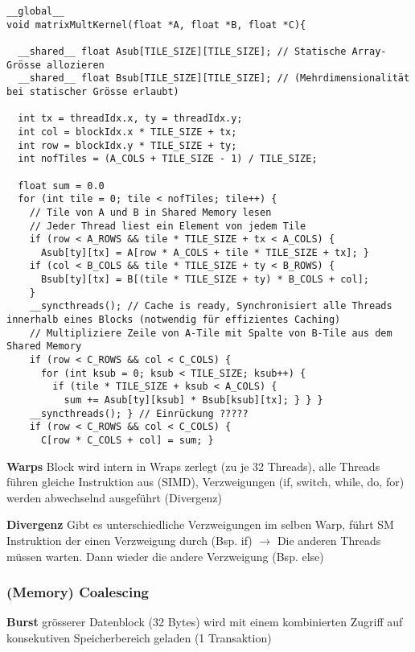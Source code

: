 \begin{lstlisting}
__global__
void matrixMultKernel(float *A, float *B, float *C){

  __shared__ float Asub[TILE_SIZE][TILE_SIZE]; // Statische Array-Grösse allozieren
  __shared__ float Bsub[TILE_SIZE][TILE_SIZE]; // (Mehrdimensionalität bei statischer Grösse erlaubt)

  int tx = threadIdx.x, ty = threadIdx.y;
  int col = blockIdx.x * TILE_SIZE + tx;
  int row = blockIdx.y * TILE_SIZE + ty;
  int nofTiles = (A_COLS + TILE_SIZE - 1) / TILE_SIZE;

  float sum = 0.0
  for (int tile = 0; tile < nofTiles; tile++) {
    // Tile von A und B in Shared Memory lesen
    // Jeder Thread liest ein Element von jedem Tile
    if (row < A_ROWS && tile * TILE_SIZE + tx < A_COLS) {
      Asub[ty][tx] = A[row * A_COLS + tile * TILE_SIZE + tx]; }
    if (col < B_COLS && tile * TILE_SIZE + ty < B_ROWS) {
      Bsub[ty][tx] = B[(tile * TILE_SIZE + ty) * B_COLS + col];
	}
	__syncthreads(); // Cache is ready, Synchronisiert alle Threads innerhalb eines Blocks (notwendig für effizientes Caching)
	// Multipliziere Zeile von A-Tile mit Spalte von B-Tile aus dem Shared Memory
	if (row < C_ROWS && col < C_COLS) {
	  for (int ksub = 0; ksub < TILE_SIZE; ksub++) {
	    if (tile * TILE_SIZE + ksub < A_COLS) {
          sum += Asub[ty][ksub] * Bsub[ksub][tx]; } } }
    __syncthreads(); } // Einrückung ?????
	if (row < C_ROWS && col < C_COLS) {
	  C[row * C_COLS + col] = sum; }
\end{lstlisting}


\textbf{Warps}
Block wird intern in Wraps zerlegt (zu je 32 Threads), alle Threads führen gleiche Instruktion aus (SIMD), Verzweigungen (if, switch, while, do, for) werden abwechselnd ausgeführt (Divergenz)

\textbf{Divergenz}
Gibt es unterschiedliche Verzweigungen im selben Warp, führt SM Instruktion der einen Verzweigung durch (Bsp. if) $\rightarrow$ Die anderen Threads müssen warten. Dann wieder die andere Verzweigung (Bsp. else)


\subsubsection{(Memory) Coalescing}

\textbf{Burst} grösserer Datenblock (32 Bytes) wird mit einem kombinierten Zugriff auf konsekutiven Speicherbereich geladen (1 Transaktion)
